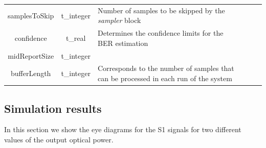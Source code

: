 \begin{table}[]
\begin{tabular}{|c|c|p{70mm}|ccp{70mm}}
		samplesToSkip & t\_integer & Number of samples to be skipped by the \textit{sampler} block &    \\ \cline{1-3}
		confidence & t\_real & Determines the confidence limits for the BER estimation &    \\ \cline{1-3}
		midReportSize & t\_integer &  &    \\ \cline{1-3}
		bufferLength & t\_integer & Corresponds to the number of samples that can be processed in each run of the system &    \\ \cline{1-3}
		\end{tabular}
		\label{table:in_par}
		\end{table}

\subsection*{Simulation results}

In this section we show the eye diagrams for the S1 signals for two different values of the output optical power.

